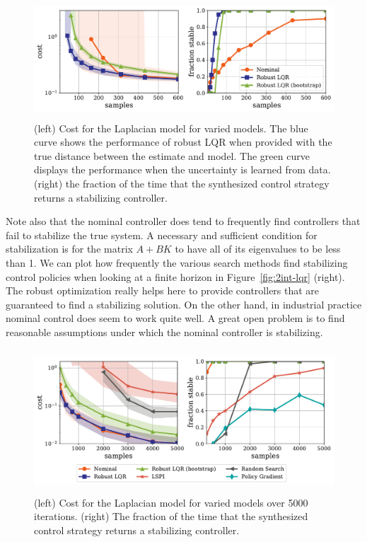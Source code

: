 \documentclass[11pt]{article}
\newcommand{\fig}[1]{Figure~\ref{fig:#1}}
\numberwithin{equation}{section}
\begin{document}
\begin{figure}[t]
\centering
\includegraphics[height=1.75in]{figs/datacen_600.pdf} 
\caption{
(left) Cost for the Laplacian model for varied models. The blue curve shows the performance of robust LQR when provided with the true distance between the estimate and model.  The green curve displays the performance when the uncertainty is learned from data. (right) the fraction of the time that the synthesized control strategy returns a stabilizing controller.}\label{fig:datacen-lqr1}
\end{figure}

Note also that the nominal controller does tend to frequently find controllers that fail to stabilize the true system. A necessary and sufficient condition for stabilization is for the matrix $A+BK$ to have all of its eigenvalues to be less than 1. We can plot how frequently the various search methods find stabilizing control policies when looking at a finite horizon in \fig{2int-lqr} (right). The robust optimization really helps here to provide controllers that are guaranteed to find a stabilizing solution. On the other hand, in industrial practice nominal control does seem to work quite well. A great open problem is to find reasonable assumptions under which the nominal controller is stabilizing. 

\begin{figure}[t]
\centering
\includegraphics[height=2.11in]{figs/datacen_5000.pdf}
\caption{
(left) Cost for the Laplacian model for varied models over 5000 iterations. (right) The fraction of the time that the synthesized control strategy returns a stabilizing controller.}\label{fig:datacen-lqr2}
\end{figure}
\end{document}
